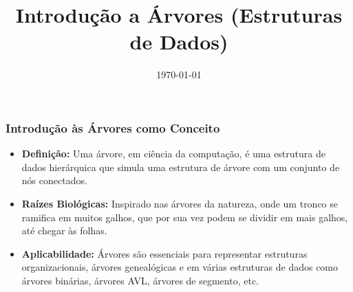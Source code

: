 \title{Introdução a Árvores (Estruturas de Dados)}
\date{\today}
\frame{\titlepage}

\begin{frame}[fragile]
  \frametitle{Introdução às Árvores como Conceito}
  \begin{itemize}
    \item \textbf{Definição:} Uma árvore, em ciência da computação, é uma estrutura de dados hierárquica que simula uma estrutura de árvore com um conjunto de nós conectados.
    \item \textbf{Raízes Biológicas:} Inspirado nas árvores da natureza, onde um tronco se ramifica em muitos galhos, que por sua vez podem se dividir em mais galhos, até chegar às folhas.
    \item \textbf{Aplicabilidade:} Árvores são essenciais para representar estruturas organizacionais, árvores genealógicas e em várias estruturas de dados como árvores binárias, árvores AVL, árvores de segmento, etc.
  \end{itemize}
\end{frame}


